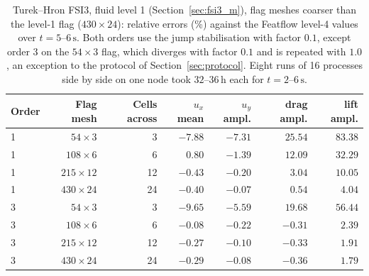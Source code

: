 \begin{table}[htbp]
	\centering
	\footnotesize
	\setlength{\tabcolsep}{3pt}
	\caption{Turek--Hron FSI3, fluid level 1 (Section~\ref{sec:fsi3_m}), flag meshes coarser than the level-1 flag ($430\times24$): relative errors (\%) against the Featflow level-4 values over $t = 5$--$6\,\mathrm{s}$. Both orders use the jump stabilisation with factor $0.1$, except order 3 on the $54\times3$ flag, which diverges with factor $0.1$ and is repeated with $1.0$, an exception to the protocol of Section~\ref{sec:protocol}. Eight runs of 16 processes side by side on one node took $32$--$36\,\mathrm{h}$ each for $t = 2$--$6\,\mathrm{s}$.}
	\label{tab:ho_fsi3}
	\begin{tabular}{lrrrrrr}
		\toprule
		Order & Flag mesh & Cells across & $u_x$ mean & $u_y$ ampl. & drag ampl. & lift ampl. \\
		\midrule
		1 & $54\times3$   & 3  & $-7.88$ & $-7.31$ & $25.54$ & $83.38$ \\
		1 & $108\times6$  & 6  & $0.80$  & $-1.39$ & $12.09$ & $32.29$ \\
		1 & $215\times12$ & 12 & $-0.43$ & $-0.20$ & $3.04$  & $10.05$ \\
		1 & $430\times24$ & 24 & $-0.40$ & $-0.07$ & $0.54$  & $4.04$ \\
		3 & $54\times3$   & 3  & $-9.65$ & $-5.59$ & $19.68$ & $56.44$ \\
		3 & $108\times6$  & 6  & $-0.08$ & $-0.22$ & $-0.31$ & $2.39$ \\
		3 & $215\times12$ & 12 & $-0.27$ & $-0.10$ & $-0.33$ & $1.91$ \\
		3 & $430\times24$ & 24 & $-0.29$ & $-0.08$ & $-0.36$ & $1.79$ \\
		\bottomrule
	\end{tabular}
\end{table}

